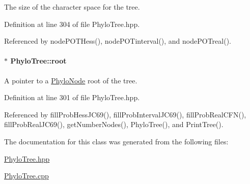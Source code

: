 \-The size of the character space for the tree. 



\-Definition at line 304 of file \-Phylo\-Tree.\-hpp.



\-Referenced by node\-P\-O\-T\-Hess(), node\-P\-O\-Tinterval(), and node\-P\-O\-Treal().

\hypertarget{classPhyloTree_a38c3253751a7ed9ffacb0978106f8173}{
\paragraph[{root}]{$\ast$ {\bf \-Phylo\-Tree\-::root}}}\label{classPhyloTree_a38c3253751a7ed9ffacb0978106f8173}


\-A pointer to a \hyperlink{classPhyloNode}{\-Phylo\-Node} root of the tree. 



\-Definition at line 301 of file \-Phylo\-Tree.\-hpp.



\-Referenced by fill\-Prob\-Hess\-J\-C69(), fill\-Prob\-Interval\-J\-C69(), fill\-Prob\-Real\-C\-F\-N(), fill\-Prob\-Real\-J\-C69(), get\-Number\-Nodes(), \-Phylo\-Tree(), and \-Print\-Tree().



\-The documentation for this class was generated from the following files\-:\begin{DoxyCompactItemize}
\item 
\hyperlink{PhyloTree_8hpp}{\-Phylo\-Tree.\-hpp}\item 
\hyperlink{PhyloTree_8cpp}{\-Phylo\-Tree.\-cpp}\end{DoxyCompactItemize}
